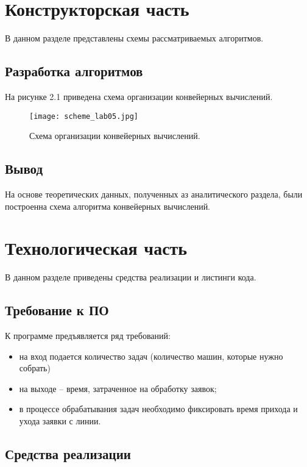 \documentclass[12pt]{report}
\begin{document}
\chapter{Конструкторская часть}

В данном разделе представлены схемы рассматриваемых алгоритмов.

\section{Разработка алгоритмов}

На рисунке 2.1 приведена схема организации конвейерных вычислений.

\begin{figure}[h]
	\centering
	\texttt{[image: scheme\_lab05.jpg]}
	\caption{Схема организации конвейерных вычислений.}
	\label{fig:mpr}
\end{figure}


\section*{Вывод}
На основе теоретических данных, полученных аз аналитического раздела, были построенна схема алгоритма конвейерных вычислений.

\chapter{Технологическая часть}

В данном разделе приведены средства реализации и листинги кода.

\section{Требование к ПО}

К программе предъявляется ряд требований:

\begin{itemize}
	\item на вход подается количество задач (количество машин, которые нужно собрать)
	\item на выходе -- время, затраченное на обработку заявок;
	\item в процессе обрабатывания задач необходимо фиксировать время прихода и ухода заявки с линии.
\end{itemize}

\section{Средства реализации}
\end{document}
